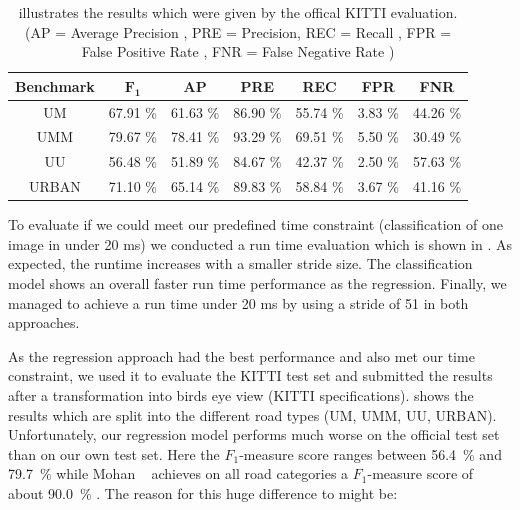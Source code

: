  \begin{table}[]
 	\begin{center}
 		\begin{tabular}{c|cccccc}
 			{\bf Benchmark} & {\bf $\mathbf{F_1}$} & {\bf AP} & {\bf PRE} & {\bf REC} & {\bf FPR} & {\bf FNR}\\ \hline
 			UM & 67.91 \% & 61.63 \% & 86.90 \% & 55.74 \% & 3.83 \% & 44.26 \%\\
 			UMM & 79.67 \% & 78.41 \% & 93.29 \% & 69.51 \% & 5.50 \% & 30.49 \%\\
 			UU  & 56.48 \% & 51.89 \% & 84.67 \% & 42.37 \% & 2.50 \% & 57.63 \%\\
 			URBAN & 71.10 \% & 65.14 \% & 89.83 \% & 58.84 \% & 3.67 \% & 41.16 \%\\
 		\end{tabular}
 	\end{center}
 	 		\caption{illustrates the results which were given by the offical KITTI evaluation. (AP = Average Precision , PRE = Precision, REC = Recall , FPR = False Positive Rate , FNR = False Negative Rate  )}
 	 		\label{tab:kitti}
 \end{table}







To evaluate if we could meet our predefined time constraint (classification of one image in under 20 ms) we conducted a run time evaluation which is shown in . As expected, the runtime increases with a smaller stride size. The classification model shows an overall faster run time performance as the regression. Finally, we managed to achieve a run time under 20 ms by using a stride of 51 in both approaches.





As the regression approach had the best performance and also met our time constraint, we used it to evaluate the KITTI test set and submitted the results after a transformation into birds eye view (KITTI specifications). shows the results which are split into the different road types (UM, UMM, UU, URBAN).
Unfortunately, our regression model performs much worse on the official test set than on our own test set. Here the $F_1$-measure score ranges between \SI{56.4}{\percent} and \SI{79.7}{\percent} while Mohan ~\cite{Tarel2009} achieves on all road categories a $F_1$-measure score of about \SI{90.0}{\percent} . The reason for this huge difference to might be: \\

